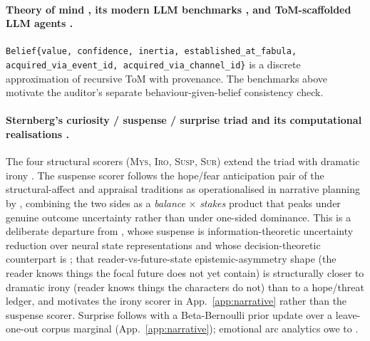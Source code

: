 \documentclass[11pt]{article}
\begin{document}
\paragraph{Theory of mind
\citep{premack1978tom,wimmer1983false,baroncohen1985autism,
zunshine2006theory,baker2009inverseplanning,chandra2024inverse}, its modern LLM
benchmarks \citep{kim2023fantom,gu2026simpletom}, and ToM-scaffolded
LLM agents \citep{cross2024hyp}.}
\texttt{Belief\{value, confidence, inertia,
established\_at\_fabula, acquired\_via\_event\_id,
acquired\_via\_channel\_id\}} is a discrete approximation of
recursive ToM with provenance. The benchmarks above motivate the
auditor's separate behaviour-given-belief consistency check.

\paragraph{Sternberg's curiosity / suspense / surprise triad
\citep{sternberg1978expositional,sternberg1992telling,
brewer1982stories,baroni2007tension} and its computational realisations
\citep{cheong2015suspenser,baeyoung2008surprise,
elyfrankel2015suspense,wilmot2020suspense,wilmot2021emnlp,
wilmot2022phd}.} The four structural scorers (\textsc{Mys},
\textsc{Iro}, \textsc{Susp}, \textsc{Sur}) extend the triad with
dramatic irony \citep{booth1974irony,gerrig1993narrative}. The
suspense scorer follows the hope/fear anticipation pair of the
structural-affect and appraisal traditions
\citep{brewer1982stories,comisky1982suspense,ortony1988occ,
zillmann1996suspense,gerrig1989suspense} as operationalised in narrative planning by
\citet{cheong2015suspenser}, combining the two sides as a
\emph{balance$\,\times\,$stakes} product that peaks under genuine
outcome uncertainty rather than under one-sided dominance. This is
a deliberate departure from \citet{wilmot2020suspense}, whose
suspense is information-theoretic uncertainty reduction over neural
state representations and whose decision-theoretic counterpart is
\citet{elyfrankel2015suspense}; that reader-vs-future-state
epistemic-asymmetry shape (the reader knows things the focal future
does not yet contain) is structurally closer to dramatic irony
(reader knows things the characters do not) than to a hope/threat
ledger, and motivates the irony scorer in
App.~\ref{app:narrative} rather than the suspense scorer. Surprise
follows \citet{ittibaldi2009surprise} with a Beta-Bernoulli prior update
over a leave-one-out corpus marginal (App.~\ref{app:narrative}); emotional
arc analytics owe to \citet{reagan2016arcs}.
\end{document}
